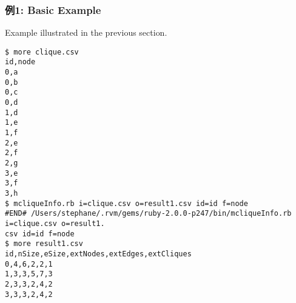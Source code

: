 \subsubsection*{例1: Basic Example}

Example illustrated in the previous section.


\begin{Verbatim}[baselinestretch=0.7,frame=single]
$ more clique.csv
id,node
0,a
0,b
0,c
0,d
1,d
1,e
1,f
2,e
2,f
2,g
3,e
3,f
3,h
$ mcliqueInfo.rb i=clique.csv o=result1.csv id=id f=node
#END# /Users/stephane/.rvm/gems/ruby-2.0.0-p247/bin/mcliqueInfo.rb i=clique.csv o=result1.
csv id=id f=node
$ more result1.csv
id,nSize,eSize,extNodes,extEdges,extCliques
0,4,6,2,2,1
1,3,3,5,7,3
2,3,3,2,4,2
3,3,3,2,4,2
\end{Verbatim}
